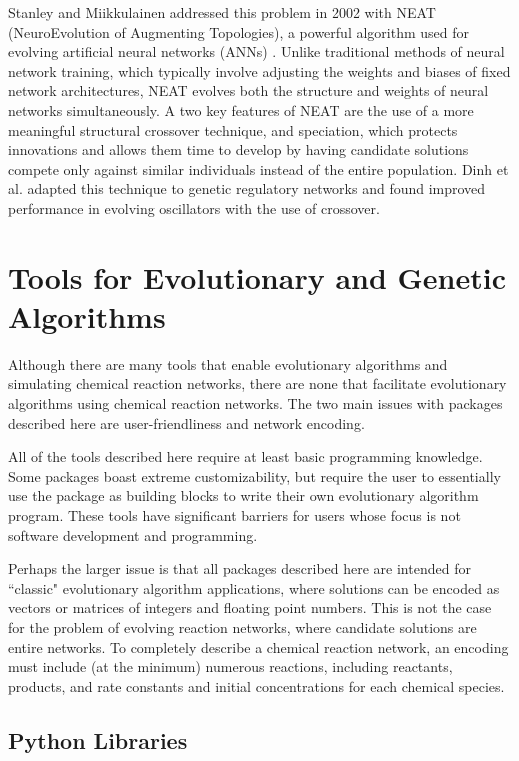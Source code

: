 \documentclass[12pt]{report}
\begin{document}
Stanley and Miikkulainen addressed this problem in 2002 with NEAT (NeuroEvolution of Augmenting Topologies), a powerful algorithm used for evolving artificial neural networks (ANNs) \cite{stanley_evolving_2002}. Unlike traditional methods of neural network training, which typically involve adjusting the weights and biases of fixed network architectures, NEAT evolves both the structure and weights of neural networks simultaneously. A two key features of NEAT are the use of a more meaningful structural crossover technique, and speciation, which protects innovations and allows them time to develop by having candidate solutions compete only against similar individuals instead of the entire population. Dinh et al. adapted this technique to genetic regulatory networks and found improved performance in evolving oscillators with the use of crossover.

\section{Tools for Evolutionary and Genetic Algorithms}
\label{section:tools_GA}
Although there are many tools that enable evolutionary algorithms and simulating chemical reaction networks, there are none that facilitate evolutionary algorithms using chemical reaction networks. The two main issues with packages described here are user-friendliness and network encoding.

All of the tools described here require at least basic programming knowledge. Some packages boast extreme customizability, but require the user to essentially use the package as building blocks to write their own evolutionary algorithm program. These tools have significant barriers for users whose focus is not software development and programming.

Perhaps the larger issue is that all packages described here are intended for ``classic" evolutionary algorithm applications, where solutions can be encoded as vectors or matrices of integers and floating point numbers. This is not the case for the problem of evolving reaction networks, where candidate solutions are entire networks. To completely describe a chemical reaction network, an encoding must include (at the minimum) numerous reactions, including reactants, products, and rate constants and initial concentrations for each chemical species.  

\subsection{Python Libraries}
\end{document}
